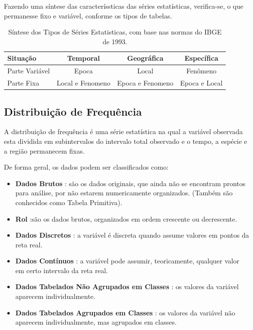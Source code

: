 Fazendo uma síntese das caracteríssticas das séries estatísticas, verifica-se, o que permanesse fixo e variável, conforme os tipos de tabelas.


\begin{table}[!htb]
    \centering
    {
    \caption{Síntese dos Tipos de Séries Estatisticas, com base nas normas
do IBGE de 1993.}
    \label{sintese serie}
    \vspace{0.1cm}
\begin{tabular}{l||c||c||c}
  \hline\hline
  Situação       & Temporal          & Geográfica       & Específica     \\
  \hline\hline
  Parte Variável &  Epoca            & Local            & Fenômeno      \\
  Parte Fixa     &  Local e Fenomeno & Epoca e Fenomeno & Epoca e Local \\
  \hline\hline
\end{tabular}}
\end{table}












\newpage
\subsection{Distribuição de Frequência}

\inic A distribuição de frequência é uma série estatística na qual a variável observada esta dividida em subintervalos do intervalo total observado e o tempo, a espécie e a região permanecem fixas.\vskip0.3cm

De forma geral, os dados podem ser classificados como:


\begin{itemize}
  \item \textbf{Dados Brutos} : são os dados originais, que ainda não se encontram prontos para análise, por não estarem numericamente organizados. (Também são conhecidos como Tabela Primitiva).
  \item \textbf{Rol} :são os dados brutos, organizados em ordem crescente ou decrescente.
  \item \textbf{Dados Discretos} : a variável é discreta quando assume valores em pontos da reta real.
  \item \textbf{Dados Contínuos} : a variável pode assumir, teoricamente, qualquer valor em certo intervalo da reta real.
  \item \textbf{Dados Tabelados Não Agrupados em Classes} : os valores da variável aparecem individualmente.
  \item \textbf{Dados Tabelados Agrupados em Classes} : os valores da variável não aparecem individualmente, mas agrupados em classes.
\end{itemize}


